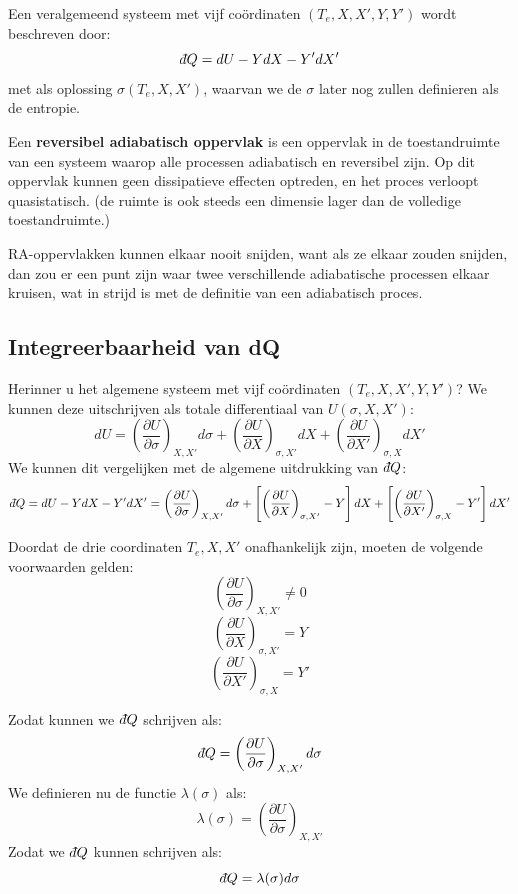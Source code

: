 Een veralgemeend systeem met vijf coördinaten \((T_e, X, X', Y, Y')\) wordt beschreven door:
\[
\dbar Q = dU - YdX - Y'dX'
\]
met als oplossing \(\sigma (T_e, X, X')\), waarvan we de \(\sigma\) later nog zullen definieren als de entropie.

\begin{definition}
    Een \textbf{reversibel adiabatisch oppervlak} is een oppervlak in de toestandruimte van een systeem waarop alle processen adiabatisch en reversibel zijn.
    Op dit oppervlak kunnen geen dissipatieve effecten optreden, en het proces verloopt quasistatisch. (de ruimte is ook steeds een dimensie lager dan de volledige toestandruimte.)
\end{definition}

RA-oppervlakken kunnen elkaar nooit snijden, want als ze elkaar zouden snijden,
dan zou er een punt zijn waar twee verschillende adiabatische processen elkaar kruisen, wat in strijd is met de definitie van een adiabatisch proces.

\subsection{Integreerbaarheid van dQ}


Herinner u het algemene systeem met vijf coördinaten \((T_e, X, X', Y, Y')\)? We kunnen deze uitschrijven als totale differentiaal van \(U(\sigma, X, X')\):
\[dU = \left(\frac{\partial U}{\partial \sigma}\right)_{X, X'} d\sigma + \left(\frac{\partial U}{\partial X}\right)_{\sigma, X'} dX + \left(\frac{\partial U}{\partial X'}\right)_{\sigma, X} dX'\]
We kunnen dit vergelijken met de algemene uitdrukking van \(\dbar Q\):
\[\dbar Q = dU - YdX - Y'dX' = \left(\frac{\partial U}{\partial \sigma}\right)_{X, X'} d\sigma + \left[\left(\frac{\partial U}{\partial X}\right)_{\sigma, X'} - Y\right] dX + \left[\left(\frac{\partial U}{\partial X'}\right)_{\sigma, X} - Y'\right] dX'\]

Doordat de drie coordinaten \(T_e, X, X'\) onafhankelijk zijn, moeten de volgende voorwaarden gelden:
\[\left(\frac{\partial U}{\partial \sigma}\right)_{X, X'} \neq 0\]
\[\left(\frac{\partial U}{\partial X}\right)_{\sigma, X'} = Y\]
\[\left(\frac{\partial U}{\partial X'}\right)_{\sigma, X} = Y'\]

Zodat kunnen we \(\dbar Q\) schrijven als:
\[\dbar Q = \left(\frac{\partial U}{\partial \sigma}\right)_{X, X'} d\sigma\]
We definieren nu de functie \(\lambda(\sigma)\) als:
\[\lambda(\sigma) = \left(\frac{\partial U}{\partial \sigma}\right)_{X, X'}\]
Zodat we \(\dbar Q\) kunnen schrijven als:
\[\dbar Q = \lambda(\sigma) d\sigma\]

